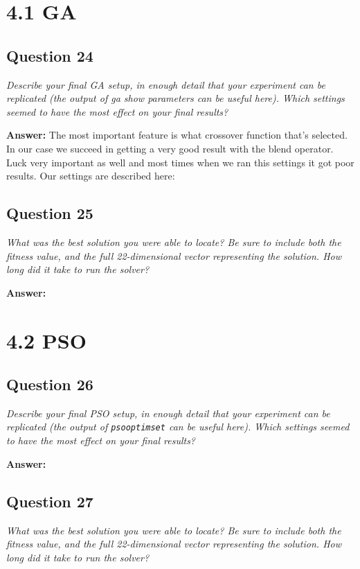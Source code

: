 \documentclass[a4paper]{article}
\begin{document}
\section*{4.1 GA}

\subsection*{Question 24}
\emph{Describe your final GA setup, in enough detail that your experiment can be replicated (the output of ga show parameters can be useful here). Which settings seemed to have the most effect on your final results?}

\textbf{Answer:} The most important feature is what crossover function that's selected. In our case we succeed in getting a very good result with the blend operator. Luck very important as well and most times when we ran this settings it got poor results. 
Our settings are described here:


\subsection*{Question 25}
\emph{What was the best solution you were able to locate? Be sure to
include both the fitness value, and the full 22-dimensional vector representing
the solution. How long did it take to run the solver?}

\textbf{Answer:}

\section*{4.2 PSO}

\subsection*{Question 26}
\emph{Describe your final PSO setup, in enough detail that your experiment can be replicated (the output of \texttt{psooptimset} can be useful here). Which settings seemed to have the most effect on your final results?}

\textbf{Answer:}

\subsection*{Question 27}
\emph{What was the best solution you were able to locate? Be sure to
include both the fitness value, and the full 22-dimensional vector representing the solution. How long did it take to run the solver?}
\end{document}

